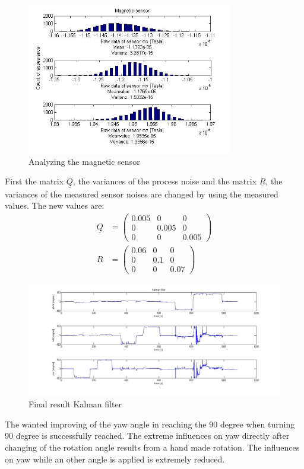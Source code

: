 \begin{figure}[H]
	\centering\includegraphics[width=0.8\textwidth]{fig/Res_Kal_Comp/varMag3}
	\caption{Analyzing the magnetic sensor}
	\label{fig:varMag}
\end{figure}
First the matrix $\underline Q$, the variances of the process noise and the matrix $\underline R$, the variances of the measured sensor noises are changed by using the measured values. The new values are:\\
\begin{align}
\underline{Q} &= \begin{pmatrix} 0.005&0&0 \\ 0&0.005&0 \\ 0&0&0.005 \end{pmatrix}\\
\underline{R} &= \begin{pmatrix} 0.06&0&0 \\ 0&0.1&0 \\ 0&0&0.07 \end{pmatrix}
\end{align}

\begin{figure}[H]
	\centering\includegraphics[width=1.0\textwidth]{fig/Res_Kal_Comp/final_Kalman1}
	\caption{Final result Kalman filter}
	\label{fig:final_Kalman}
\end{figure}
The wanted improving of the yaw angle in reaching the 90 degree when turning 90 degree is successfully reached. The extreme influences on yaw directly after changing of the rotation angle results from a hand made rotation. The influences on yaw while an other angle is applied is extremely reduced.\\

